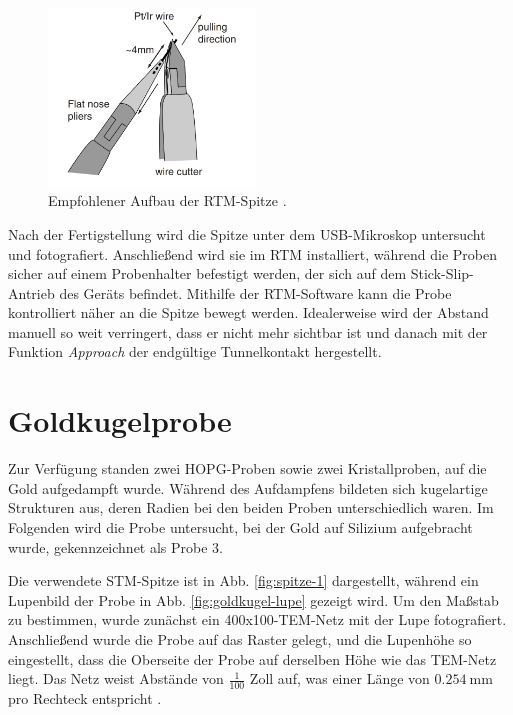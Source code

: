 \documentclass{article}
\newcommand{\defc}{black}
\newcommand{\colorT}[2][blue]{\color{#1}{#2}\color{\defc}}
\newcommand{\todo}[1]{\colorT[red]{\textbf{(#1)}}}
\begin{document}
\begin{figure}[h!]
    \centering
    \includegraphics[width=0.49\textwidth]{spitzeanleitung.png}
    \caption{Empfohlener Aufbau der RTM-Spitze \cite{easyScan}.}
    \label{fig:spitze_anl}
\end{figure}

Nach der Fertigstellung wird die Spitze unter dem USB-Mikroskop untersucht und fotografiert.
Anschließend wird sie im RTM installiert, während die Proben sicher auf einem Probenhalter
befestigt werden, der sich auf dem Stick-Slip-Antrieb des Geräts befindet. Mithilfe der
RTM-Software kann die Probe kontrolliert näher an die Spitze bewegt werden. Idealerweise
wird der Abstand manuell so weit verringert, dass er nicht mehr sichtbar ist und danach mit der
Funktion \textit{Approach} der endgültige Tunnelkontakt hergestellt. 

\newpage
\section{Goldkugelprobe}

Zur Verfügung standen zwei HOPG-Proben sowie zwei Kristallproben, auf die Gold aufgedampft wurde. Während des Aufdampfens bildeten sich kugelartige Strukturen aus, deren Radien bei den beiden Proben unterschiedlich waren. Im Folgenden wird die Probe untersucht, bei der Gold auf Silizium aufgebracht wurde, gekennzeichnet als Probe 3.

Die verwendete STM-Spitze ist in Abb. \ref{fig:spitze-1} dargestellt, während ein Lupenbild der Probe in Abb. \ref{fig:goldkugel-lupe} gezeigt wird. Um den Maßstab zu bestimmen, wurde zunächst ein 400x100-TEM-Netz mit der Lupe fotografiert. Anschließend wurde die Probe auf das Raster gelegt, und die Lupenhöhe so eingestellt, dass die Oberseite der Probe auf derselben Höhe wie das TEM-Netz liegt. Das Netz weist Abstände von $\frac{1}{100}$ Zoll auf, was einer Länge von $\SI{0.254}{\mm}$ pro Rechteck entspricht \cite{meshsize}.
\end{document}

